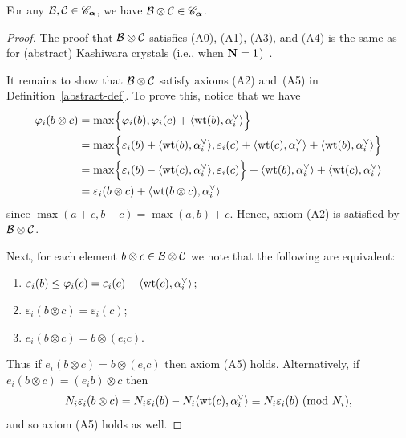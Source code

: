 \documentclass[11pt]{article}
\begin{document}
\begin{proposition}
\label{prop:tensor_containment}
For any $\mathcal{B}, \mathcal{C} \in \mathscr{C}_{\boldsymbol{\alpha}}$, we have $\mathcal{B} \otimes \mathcal{C} \in \mathscr{C}_{\boldsymbol{\alpha}}$.
\end{proposition}

\begin{proof}
The proof that $\mathcal{B} \otimes \mathcal{C}$ satisfies (A0), (A1), (A3), and (A4) is the same as for (abstract) Kashiwara crystals (i.e., when $\mathbf{N} = 1$)~\cite[\S2.3]{BumpSchilling}.

It remains to show that $\mathcal{B}\otimes \mathcal{C}$ satisfy axioms (A2) and~(A5) in Definition~\ref{abstract-def}.
To prove this, notice that 
we have
\begin{align*}
\varphi_i(b \otimes c)
& = \max\Bigl\{\varphi_i(b), \varphi_i(c) + \langle \operatorname{wt}(b), \alpha_i^{\vee} \rangle \Bigr\}
\\ & = \max\Bigl\{\varepsilon_i(b) + \langle \operatorname{wt}(b), \alpha_i^{\vee} \rangle, \varepsilon_i(c) + \langle \operatorname{wt}(c), \alpha_i^{\vee} \rangle + \langle \operatorname{wt}(b), \alpha_i^{\vee} \rangle \Bigr\}
\\ & = \max\Bigl\{\varepsilon_i(b) - \langle \operatorname{wt}(c), \alpha_i^{\vee} \rangle, \varepsilon_i(c) \Bigr\} + \langle \operatorname{wt}(b), \alpha_i^{\vee} \rangle + \langle \operatorname{wt}(c), \alpha_i^{\vee} \rangle
\\ & = \varepsilon_i(b \otimes c) + \langle \operatorname{wt}(b \otimes c), \alpha_i^{\vee} \rangle
\end{align*}
since $\max(a+c, b+c) = \max(a,b) + c$.
Hence, axiom (A2) is satisfied by $\mathcal{B} \otimes \mathcal{C}$.

Next, for each element $b \otimes c \in \mathcal{B} \otimes \mathcal{C}$ we note that the following are equivalent:
\begin{enumerate}
\item[(1)] $\varepsilon_i(b) \leq \varphi_i(c) = \varepsilon_i(c) + \langle \operatorname{wt}(c), \alpha_i^{\vee} \rangle$;
\item[(2)] $\varepsilon_i(b \otimes c) = \varepsilon_i(c)$;
\item[(3)] $e_i(b \otimes c) = b \otimes (e_i c)$.
\end{enumerate}
Thus if $e_i(b \otimes c) = b \otimes (e_i c)$ then axiom (A5) holds.
Alternatively, if $e_i(b \otimes c) = (e_i b) \otimes c$ then
\[
N_i \varepsilon_i(b \otimes c) = N_i \varepsilon_i(b) - N_i \langle \operatorname{wt}(c), \alpha_i^{\vee} \rangle \equiv N_i \varepsilon_i(b) \ (\mathrm{mod}\  N_i),
\]
and so axiom (A5) holds as well.
\end{proof}
\end{document}
